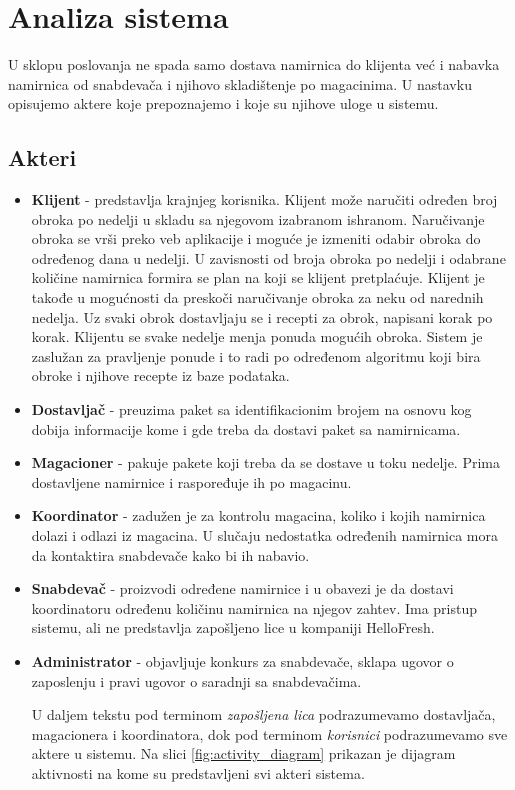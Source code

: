 
\section{Analiza sistema}

	U sklopu poslovanja ne spada samo dostava namirnica do klijenta već i nabavka namirnica od snabdevača i njihovo skladištenje po magacinima. U nastavku opisujemo aktere koje prepoznajemo i koje su njihove uloge u sistemu.

\subsection{Akteri}
	\begin{itemize}
		\item{\textbf{Klijent}} - predstavlja krajnjeg korisnika. Klijent može naručiti određen broj obroka po nedelji u skladu sa njegovom izabranom ishranom. Naručivanje obroka se vrši preko veb aplikacije i moguće je izmeniti odabir obroka do određenog dana u nedelji. U zavisnosti od broja obroka po nedelji i odabrane količine namirnica formira se plan na koji se klijent pretplaćuje. Klijent je takođe u mogućnosti da preskoči naručivanje obroka za neku od narednih nedelja. Uz svaki obrok dostavljaju se i recepti za obrok, napisani korak po korak. Klijentu se svake nedelje menja ponuda mogućih obroka. Sistem je zaslužan za pravljenje ponude i to radi po određenom algoritmu koji bira obroke i njihove recepte iz baze podataka.
		\item{\textbf{Dostavljač}} - preuzima paket sa identifikacionim brojem na osnovu kog dobija informacije kome i gde treba da dostavi paket sa namirnicama.
		\item{\textbf{Magacioner}} - pakuje pakete koji treba da se dostave u toku nedelje. Prima dostavljene namirnice i raspoređuje ih po magacinu.
		\item{\textbf{Koordinator}} - zadužen je za kontrolu magacina, koliko i kojih namirnica dolazi i odlazi iz magacina. U slučaju nedostatka određenih namirnica mora da kontaktira snabdevače kako bi ih nabavio.
		\item{\textbf{Snabdevač}} - proizvodi određene namirnice i u obavezi je da dostavi koordinatoru određenu količinu namirnica na njegov zahtev. Ima pristup sistemu, ali ne predstavlja zapošljeno lice u kompaniji HelloFresh.
		\item{\textbf{Administrator}} - objavljuje konkurs za snabdevače, sklapa ugovor o zaposlenju i pravi ugovor o saradnji sa snabdevačima.
		
		U daljem tekstu pod terminom \textit{zapošljena lica} podrazumevamo dostavljača, magacionera i koordinatora, dok pod terminom \textit{korisnici} podrazumevamo sve aktere u sistemu. Na slici \ref{fig:activity_diagram} prikazan je dijagram aktivnosti na kome su predstavljeni svi akteri sistema.
		
				
	\end{itemize}
